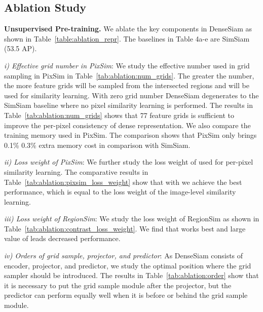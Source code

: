 \documentclass[runningheads]{llncs}
\newcommand{\myparagraph}[1]{{\noindent\bf #1}}
\begin{document}
\subsection{Ablation Study}
\myparagraph{Unsupervised Pre-training.} We ablate the key components in DenseSiam as shown in Table~\ref{table:ablation_repr}.
The baselines in Table 4a-e are SimSiam (53.5 AP).

\noindent
\emph{i) Effective grid number  in PixSim}: We study the effective number  used in grid sampling in PixSim in Table~\ref{tab:ablation:num_grids}.
The greater the number, the more feature grids will be sampled from the intersected regions and will be used for similarity learning.
With zero grid number DenseSiam degenerates to the SimSiam baseline where no pixel similarity learning is performed.
The results in Table~\ref{tab:ablation:num_grids} shows that 77 feature grids is sufficient to improve the per-pixel consistency of dense representation.
We also compare the training memory used in PixSim.
The comparison shows that PixSim only brings 0.1\%  0.3\% extra memory cost in comparison with SimSiam.

\noindent
\emph{ii) Loss weight of PixSim}: We further study the loss weight  of  used for per-pixel similarity learning.
The comparative results in Table~\ref{tab:ablation:pixsim_loss_weight} show that with  we achieve the best performance,
which is equal to the loss weight of the image-level similarity learning.

\noindent
\emph{iii) Loss weight of RegionSim}: We study the loss weight  of RegionSim as shown in Table~\ref{tab:ablation:contrast_loss_weight}.
We find that  works best and large value of  leads decreased performance.

\noindent
\emph{iv) Orders of grid sample, projector, and predictor}: As DenseSiam consists of encoder, projector, and predictor, we study the optimal position where the grid sampler should be introduced.
The results in Table~\ref{tab:ablation:order} show that it is necessary to put the grid sample module after the projector, but the predictor can perform equally well when it is before or behind the grid sample module.
\end{document}
